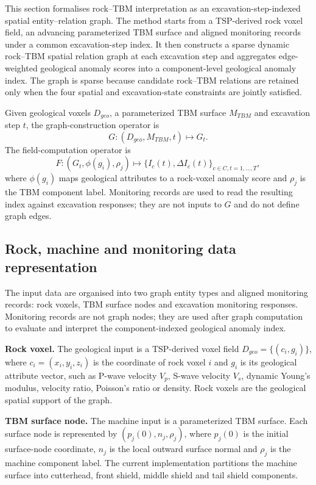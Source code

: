 This section formalises rock--TBM interpretation as an excavation-step-indexed spatial entity--relation graph. The method starts from a TSP-derived rock voxel field, an advancing parameterized TBM surface and aligned monitoring records under a common excavation-step index. It then constructs a sparse dynamic rock--TBM spatial relation graph at each excavation step and aggregates edge-weighted geological anomaly scores into a component-level geological anomaly index. The graph is sparse because candidate rock--TBM relations are retained only when the four spatial and excavation-state constraints are jointly satisfied.

Given geological voxels $D_{geo}$, a parameterized TBM surface $M_{TBM}$ and excavation step $t$, the graph-construction operator is
\begin{equation}
G : (D_{geo}, M_{TBM}, t) \mapsto G_t .
\end{equation}
The field-computation operator is
\begin{equation}
F : (G_t, \phi(g_i), \rho_j) \mapsto \{I_c(t), \Delta I_c(t)\}_{c\in C,t=1,\ldots,T},
\end{equation}
where $\phi(g_i)$ maps geological attributes to a rock-voxel anomaly score and $\rho_j$ is the TBM component label. Monitoring records are used to read the resulting index against excavation responses; they are not inputs to $G$ and do not define graph edges.


\subsection{Rock, machine and monitoring data representation}
The input data are organised into two graph entity types and aligned monitoring records: rock voxels, TBM surface nodes and excavation monitoring responses. Monitoring records are not graph nodes; they are used after graph computation to evaluate and interpret the component-indexed geological anomaly index.

\textbf{Rock voxel.} The geological input is a TSP-derived voxel field $D_{geo}=\{(c_i,g_i)\}$, where $c_i=(x_i,y_i,z_i)$ is the coordinate of rock voxel $i$ and $g_i$ is its geological attribute vector, such as P-wave velocity $V_p$, S-wave velocity $V_s$, dynamic Young's modulus, velocity ratio, Poisson's ratio or density. Rock voxels are the geological spatial support of the graph.

\textbf{TBM surface node.} The machine input is a parameterized TBM surface. Each surface node is represented by $(p_j(0),n_j,\rho_j)$, where $p_j(0)$ is the initial surface-node coordinate, $n_j$ is the local outward surface normal and $\rho_j$ is the machine component label. The current implementation partitions the machine surface into cutterhead, front shield, middle shield and tail shield components.

